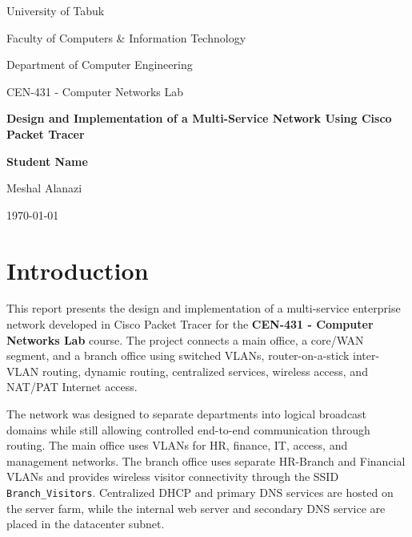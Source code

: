 \documentclass[12pt,a4paper]{article}
\begin{document}
\begin{titlepage}
    \centering
    {\Large University of Tabuk\par}
    \vspace{0.15cm}
    {\large Faculty of Computers \& Information Technology\par}
    \vspace{0.15cm}
    {\large Department of Computer Engineering\par}
    \vspace{1.5cm}
    {\large CEN-431 - Computer Networks Lab\par}
    \vspace{1.7cm}
    {\Huge\bfseries Design and Implementation of a Multi-Service Network Using Cisco Packet Tracer\par}
    \vspace{1.8cm}
    {\large\textbf{Student Name}\par}
    \vspace{0.3cm}
    {\large Meshal Alanazi\par}
    \vfill
    {\large \today\par}
\end{titlepage}

\tableofcontents
\newpage

\section{Introduction}

This report presents the design and implementation of a multi-service enterprise network developed in Cisco Packet Tracer for the \textbf{CEN-431 - Computer Networks Lab} course. The project connects a main office, a core/WAN segment, and a branch office using switched VLANs, router-on-a-stick inter-VLAN routing, dynamic routing, centralized services, wireless access, and NAT/PAT Internet access.

The network was designed to separate departments into logical broadcast domains while still allowing controlled end-to-end communication through routing. The main office uses VLANs for HR, finance, IT, access, and management networks. The branch office uses separate HR-Branch and Financial VLANs and provides wireless visitor connectivity through the SSID \texttt{Branch\_Visitors}. Centralized DHCP and primary DNS services are hosted on the server farm, while the internal web server and secondary DNS service are placed in the datacenter subnet.
\end{document}
